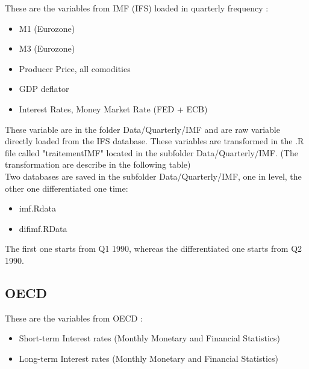 \documentclass[11pt,a4paper]{article}
\begin{document}
\vspace{0.5cm}



These are the variables from IMF (IFS) loaded in quarterly frequency :
\begin{itemize}
\item M1 (Eurozone)
\item M3 (Eurozone)
\item Producer Price, all comodities
\item GDP deflator 
\item Interest Rates, Money Market Rate (FED + ECB)
\end{itemize}

\vspace{0.5cm}

These variable are in the folder Data/Quarterly/IMF and are raw variable directly loaded from the IFS database. These variables are transformed in the .R file called "traitementIMF" located in the subfolder Data/Quarterly/IMF. (The transformation are describe in the following table) \\

Two databases are saved in the subfolder Data/Quarterly/IMF, one in level, the other one differentiated one time: 

\begin{itemize}
\item imf.Rdata 
\item difimf.RData 
\end{itemize}

\vspace{0.5cm}



The first one starts from Q1 1990, whereas the differentiated one starts from Q2 1990.






\subsection{OECD}




These are the variables from OECD :
\begin{itemize}
\item Short-term Interest rates (Monthly Monetary and Financial Statistics)
\item Long-term Interest rates (Monthly Monetary and Financial Statistics)
\end{itemize}
\end{document}
